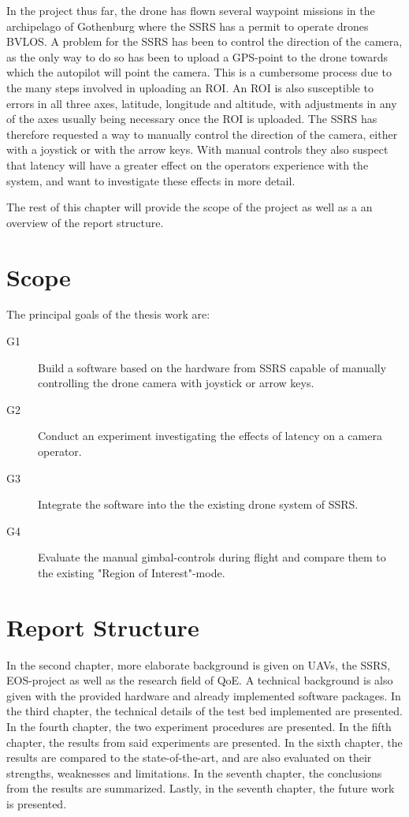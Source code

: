 \documentclass[nofilelist]{cslthse-msc}
\begin{document}
In the project thus far, the drone has flown several waypoint missions in the archipelago of Gothenburg where the SSRS has a permit to operate drones BVLOS. A problem for the SSRS has been to control the direction of the camera, as the only way to do so has been to upload a GPS-point to the drone towards which the autopilot will point the camera. This is a cumbersome process due to the many steps involved in uploading an ROI. An ROI is also susceptible to errors in all three axes, latitude, longitude and altitude, with adjustments in any of the axes usually being necessary once the ROI is uploaded. The SSRS has therefore requested a way to manually control the direction of the camera, either with a joystick or with the arrow keys. With manual controls they also suspect that latency will have a greater effect on the operators experience with the system, and want to investigate these effects in more detail.

The rest of this chapter will provide the scope of the project as well as a an overview of the report structure.

\section{Scope}
\label{sec:scope}
The principal goals of the thesis work are:
\begin{description}
   \item[G1] Build a software based on the hardware from SSRS capable of manually controlling the drone camera with joystick or arrow keys. 
   \item[G2] Conduct an experiment investigating the effects of latency on a camera operator. 
   \item[G3] Integrate the software into the the existing drone system of SSRS.
   \item[G4] Evaluate the manual gimbal-controls during flight and compare them to the existing "Region of Interest"-mode.
\end{description}

\section{Report Structure}
In the second chapter, more elaborate background is given on UAVs, the SSRS, EOS-project as well as the research field of QoE. A technical background is also given with the provided hardware and already implemented software packages. In the third chapter, the technical details of the test bed implemented are presented. In the fourth chapter, the two experiment procedures are presented. In the fifth chapter, the results from said experiments are presented. In the sixth chapter, the results are compared to the state-of-the-art, and are also evaluated on their strengths, weaknesses and limitations. In the seventh chapter, the conclusions from the results are summarized. Lastly, in the seventh chapter, the future work is presented.
\end{document}
